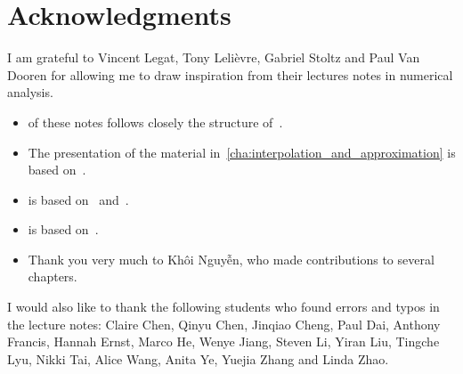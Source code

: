 \chapter*{Acknowledgments}%
\label{cha:acknowledgements}

I am grateful to Vincent Legat, Tony Lelièvre, Gabriel Stoltz and Paul Van Dooren for allowing me to draw inspiration from their lectures notes in numerical analysis.
\begin{itemize}
    \item 
         of these notes follows closely the structure of~\cite[Chapter 3]{VanDooren}.

    \item 
        The presentation of the material in~\cref{cha:interpolation_and_approximation} is based on~\cite{Legat}.

    \item
         is based on~\cite[Chapter 2]{cs} and~\cite[Chapter 5]{VanDooren}.

    \item
         is based on~\cite[Chapter 3]{cs}.
    \item
        Thank you very much to Kh\^oi Nguy\~{\^e}n,
        who made contributions to several chapters.
\end{itemize}
I would also like to thank the following students who found errors and typos in the lecture notes:
Claire Chen, Qinyu Chen, Jinqiao Cheng, Paul Dai, Anthony Francis, Hannah Ernst, Marco He, Wenye Jiang, Steven Li, Yiran Liu, Tingche Lyu, Nikki Tai, Alice Wang, Anita Ye, Yuejia Zhang and Linda Zhao.
